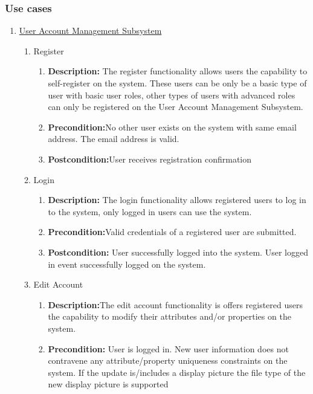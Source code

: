 \documentclass{article}
\begin{document}
	\subsubsection{Use cases}
	\begin{enumerate}
		\item \underline{User Account Management Subsystem}
			
		
	\begin{enumerate}
		\item Register
		\begin{enumerate}
			\item \textbf{Description:} The register functionality allows users the capability to self-register on the system. These users can be only be a basic type of user with basic user roles, other types of users with advanced roles can only be registered on the User Account Management Subsystem.
			\item \textbf{Precondition:}No other user exists on the system with same email address. The email address is valid.
			\item \textbf{Postcondition:}User receives registration confirmation\newline
		\end{enumerate}
		
		\item Login
		\begin{enumerate}
			\item \textbf{Description:}  The login functionality allows registered users to log in to the system, only logged in users can use the system.
			\item \textbf{Precondition:}Valid credentials of a registered user are submitted.
			\item \textbf{Postcondition:} User successfully logged into the system. User logged in event successfully logged on the system.\newline
		\end{enumerate}
		
		
		\item Edit Account
		\begin{enumerate}
			\item \textbf{Description:}The edit account functionality is offers registered users the capability to modify
their attributes and/or properties on the system.
			\item \textbf{Precondition:} User is logged in. New user information does not contravene any attribute/property uniqueness constraints on the system. If the update is/includes a display picture the file type of the new display picture is supported 


\end{enumerate}
\end{enumerate}
\end{enumerate}
\end{document}
